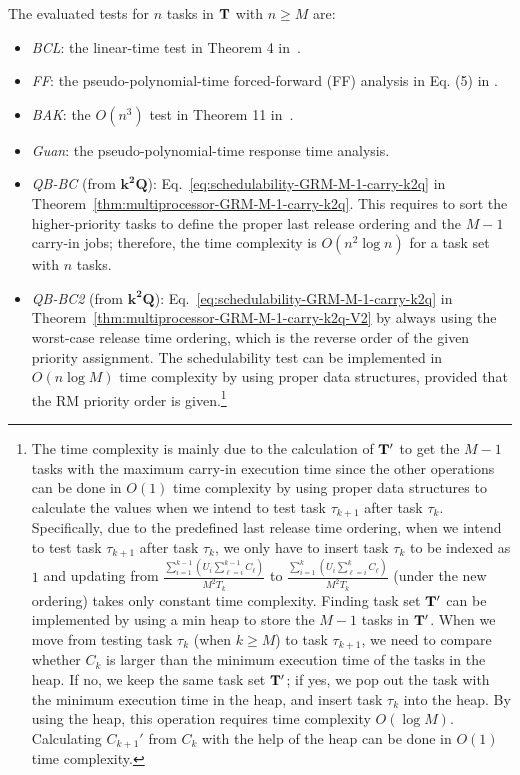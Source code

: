 \documentclass[10pt,conference]{IEEEtran}
\newcommand{\frameworkkq}[1]{$\mathbf{k^2Q}$}
\begin{document}
The evaluated tests for $n$ tasks in ${\bf T}$ with $n \geq M$ are:
\begin{itemize}
\item \emph{BCL}: the linear-time test in Theorem 4 in~\cite{bertogna2006new}.
\item \emph{FF}: the pseudo-polynomial-time forced-forward (FF) analysis in Eq. (5) in \cite{DBLP:journals/rts/BaruahBMS10}.
\item \emph{BAK}: the $O(n^3)$ test in Theorem 11 in~\cite{baker2006analysis}.
\item \emph{Guan}: the pseudo-polynomial-time response time analysis\cite{DBLP:conf/rtss/GuanSYY09}.
\item \emph{QB-BC} (from \frameworkkq{}):
  Eq.~\eqref{eq:schedulability-GRM-M-1-carry-k2q} in
  Theorem~\ref{thm:multiprocessor-GRM-M-1-carry-k2q}. This requires to
  sort the higher-priority tasks to define the proper last release
  ordering and the $M-1$ carry-in jobs; therefore, the time complexity is $O(n^2 \log n)$ for a
  task set with $n$ tasks.
\item \emph{QB-BC2} (from \frameworkkq{}):
  Eq.~\eqref{eq:schedulability-GRM-M-1-carry-k2q} in
  Theorem~\ref{thm:multiprocessor-GRM-M-1-carry-k2q-V2} by always
  using the worst-case release time ordering, which is the reverse
  order of the given priority assignment. The schedulability test can
  be implemented in $O(n\log M)$ time complexity by using proper data
  structures, provided that the RM priority order is given.\footnote{The time complexity is mainly due to the
    calculation of ${\bf T}'$ to get the $M-1$ tasks with the maximum
    carry-in execution time since the other operations can be done in
    $O(1)$ time complexity by using proper data structures to
    calculate the values when we intend to test task $\tau_{k+1}$
    after task $\tau_k$. Specifically, due to the predefined last
    release time ordering, when we intend to test task $\tau_{k+1}$
    after task $\tau_k$, we only have to insert task $\tau_k$ to be
    indexed as $1$ and updating from $\frac{\sum_{i=1}^{k-1} ( U_i
      \sum_{\ell=i}^{k-1} C_\ell )}{M^2 T_k}$  to $\frac{\sum_{i=1}^{k} ( U_i
      \sum_{\ell=i}^{k} C_\ell )}{M^2 T_k}$ (under the new ordering) takes only constant time
    complexity.  Finding task set ${\bf T}'$ can be implemented by
    using a min heap to store the $M-1$ tasks in ${\bf T}'$. When we move
    from testing task $\tau_k$ (when $k \geq M$) to task $\tau_{k+1}$,
    we need to compare whether $C_k$ is larger than the minimum
    execution time of the tasks in the heap. If no, we keep the same
    task set ${\bf T}'$; if yes, we pop out the task with the minimum
    execution time in the heap, and insert task $\tau_k$ into the
    heap.  By using the heap, this operation requires time complexity
    $O(\log M)$. Calculating $C_{k+1}'$ from $C_k$ with
    the help of the heap can be done in $O(1)$ time complexity. }
\end{itemize}
\end{document}
